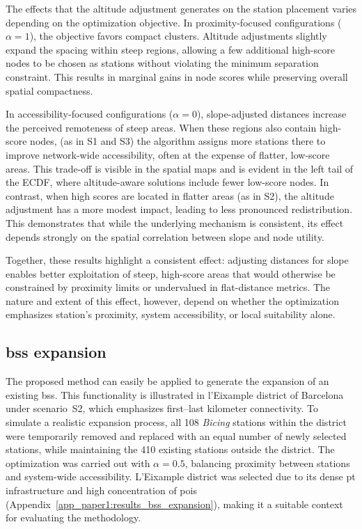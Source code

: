     The effects that the altitude adjustment generates on the station placement varies depending on the optimization objective. In proximity-focused configurations ($\alpha=1$), the objective favors compact clusters. Altitude adjustments slightly expand the spacing within steep regions, allowing a few additional high-score nodes to be chosen as stations without violating the minimum separation constraint. This results in marginal gains in node scores while preserving overall spatial compactness.

    In accessibility-focused configurations ($\alpha=0$), slope-adjusted distances increase the perceived remoteness of steep areas. When these regions also contain high-score nodes, (as in S1 and S3) the algorithm assigns more stations there to improve network-wide accessibility, often at the expense of flatter, low-score areas. This trade-off is visible in the spatial maps and is evident in the left tail of the ECDF, where altitude-aware solutions include fewer low-score nodes. In contrast, when high scores are located in flatter areas (as in S2), the altitude adjustment has a more modest impact, leading to less pronounced redistribution. This demonstrates that while the underlying mechanism is consistent, its effect depends strongly on the spatial correlation between slope and node utility.

    Together, these results highlight a consistent effect: adjusting distances for slope enables better exploitation of steep, high-score areas that would otherwise be constrained by proximity limits or undervalued in flat-distance metrics. The nature and extent of this effect, however, depend on whether the optimization emphasizes station's proximity, system accessibility, or local suitability alone.

    \subsection[BSS expansion]{\ac{bss} expansion}

    The proposed method can easily be applied to generate the expansion of an existing \ac{bss}. This functionality is illustrated in l'Eixample district of Barcelona under scenario~S2, which emphasizes first--last kilometer connectivity. To simulate a realistic expansion process, all 108 \textit{Bicing} stations within the district were temporarily removed and replaced with an equal number of newly selected stations, while maintaining the 410 existing stations outside the district. The optimization was carried out with $\alpha=0.5$, balancing proximity between stations and system-wide accessibility. L'Eixample district was selected due to its dense \ac{pt} infrastructure and high concentration of \acp{poi} (Appendix~\ref{app_paper1:results_bss_expansion}), making it a suitable context for evaluating the methodology.

